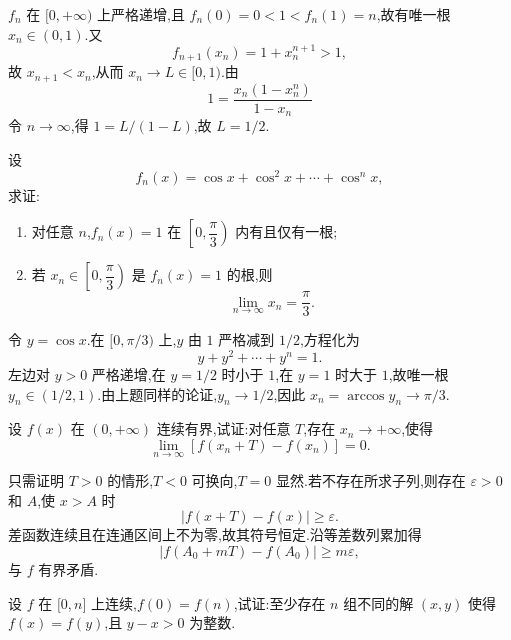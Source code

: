 \begin{solution}
    $f_n$ 在 $\lbrack0,+\infty)$ 上严格递增,且 $f_n(0)=0<1<f_n(1)=n$,故有唯一根 $x_n\in(0,1)$.又
    \[
        f_{n+1}(x_n)=1+x_n^{n+1}>1,
    \]
    故 $x_{n+1}<x_n$,从而 $x_n\to L\in\lbrack0,1)$.由
    \[
        1=\dfrac{x_n(1-x_n^n)}{1-x_n}
    \]
    令 $n\to\infty$,得 $1=L/(1-L)$,故 $L=1/2$.
\end{solution}

\begin{example}
    设
    \[
        f_n(x)=\cos x+\cos^2x+\cdots+\cos^n x,
    \]
    求证:
    \begin{enumerate}
        \item 对任意 $n$,$f_n(x)=1$ 在 $\left[0,\dfrac{\pi}{3}\right)$ 内有且仅有一根;
        \item 若 $x_n\in\left[0,\dfrac{\pi}{3}\right)$ 是 $f_n(x)=1$ 的根,则
              \[
                  \lim\limits_{n\to\infty}x_n=\dfrac{\pi}{3}.
              \]
    \end{enumerate}
\end{example}
\exampleblank

\begin{solution}
    令 $y=\cos x$.在 $\lbrack0,\pi/3)$ 上,$y$ 由 $1$ 严格减到 $1/2$,方程化为
    \[
        y+y^2+\cdots+y^n=1.
    \]
    左边对 $y>0$ 严格递增,在 $y=1/2$ 时小于 $1$,在 $y=1$ 时大于 $1$,故唯一根 $y_n\in(1/2,1)$.由上题同样的论证,$y_n\to1/2$,因此 $x_n=\arccos y_n\to\pi/3$.
\end{solution}

\begin{example}
    设 $f(x)$ 在 $(0,+\infty)$ 连续有界,试证:对任意 $T$,存在 $x_n\to+\infty$,使得
    \[
        \lim\limits_{n\to\infty}[f(x_n+T)-f(x_n)]=0.
    \]
\end{example}
\exampleblank

\begin{solution}
    只需证明 $T>0$ 的情形,$T<0$ 可换向,$T=0$ 显然.若不存在所求子列,则存在 $\varepsilon>0$ 和 $A$,使 $x>A$ 时
    \[
        |f(x+T)-f(x)|\geq\varepsilon.
    \]
    差函数连续且在连通区间上不为零,故其符号恒定.沿等差数列累加得
    \[
        |f(A_0+mT)-f(A_0)|\geq m\varepsilon,
    \]
    与 $f$ 有界矛盾.
\end{solution}

\begin{example}
    设 $f$ 在 $\lbrack 0,n\rbrack$ 上连续,$f(0)=f(n)$,试证:至少存在 $n$ 组不同的解 $(x,y)$ 使得 $f(x)=f(y)$,且 $y-x>0$ 为整数.
\end{example}
\exampleblank

